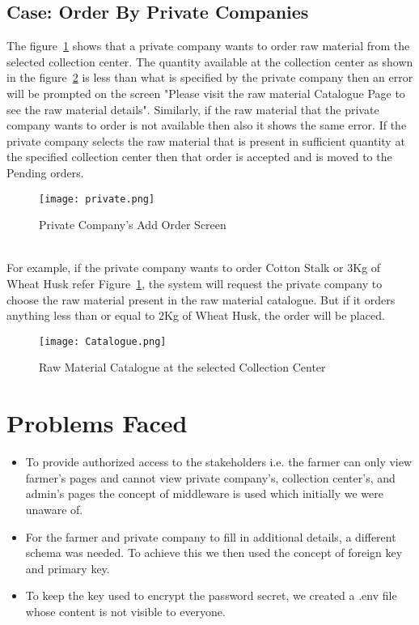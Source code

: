 \documentclass[conference]{IEEEtran}
\begin{document}
\subsection{Case: Order By Private Companies}
The figure~\ref{fig:11}  shows that a private company wants to order raw material from the selected collection center. The quantity available at the collection center as shown in the figure~\ref{fig:12} is less than what is specified by the private company then an error will be prompted on the screen "Please visit the raw material Catalogue Page to see the raw material details". Similarly, if the raw material that the private company wants to order is not available then also it shows the same error. If the private company selects the raw material that is present in sufficient quantity at the specified collection center then that order is accepted and is moved to the Pending orders.\\ 
\begin{figure}[htbp]
\centerline{\texttt{[image: private.png]}}
\caption{Private Company's Add Order Screen }
\label{fig:11}
 \end{figure}
\\For example, if the private company wants to order Cotton Stalk or 3Kg of Wheat Husk refer Figure~\ref{fig:11}, the system will request the private company to choose the raw material present in the raw material catalogue. But if it orders anything less than or equal to 2Kg of Wheat Husk, the order will be placed. \\
         \begin{figure}[htbp]
         \centerline{\texttt{[image: Catalogue.png]}}
         \caption{Raw Material Catalogue at the selected Collection Center }
         \label{fig:12}
         \end{figure}
\section{Problems Faced}
\begin{itemize}
    \item To provide authorized access to the stakeholders i.e. the farmer can only view farmer's pages and cannot view private company's, collection center's, and admin's pages the concept of middleware is used which initially we were unaware of.
    \item For the farmer and private company to fill in additional details, a different schema was needed. To achieve this we then used the concept of foreign key and primary key.
    \item To keep the key used to encrypt the password secret, we created a .env file whose content is not visible to everyone.
\end{itemize}
\end{document}
